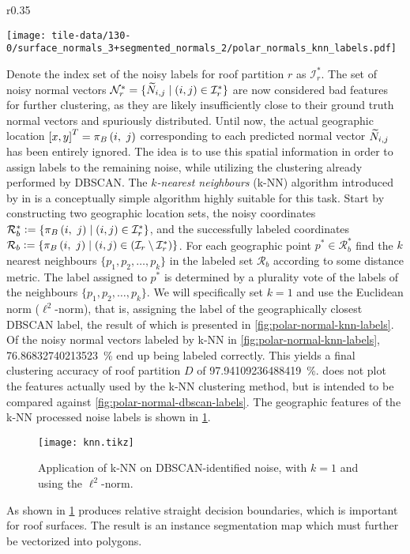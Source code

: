 \begin{wrapfigure}[16]{r}{0.35\textwidth}
  \begin{center}
    \texttt{[image: tile-data/130-0/surface\_normals\_3+segmented\_normals\_2/polar\_normals\_knn\_labels.pdf]}
  \end{center}
  \label{fig:polar-normal-knn-labels}
\end{wrapfigure}
Denote the index set of the noisy labels for roof partition $r$ as $\mathcal{I}_r^*$.
The set of noisy normal vectors $\mathcal{N}_r^* = \{\widetilde{N}_{i,j} \mid (i, j) \in \mathcal{I}_r^*\}$ are now considered bad features for further clustering, as they are likely insufficiently close to their ground truth normal vectors and spuriously distributed.
Until now, the actual geographic location ${[x, y]}^T = \pi_{B}\left(i,~j\right)$ corresponding to each predicted normal vector $\widetilde{N}_{i,j}$ has been entirely ignored.
The idea is to use this spatial information in order to assign labels to the remaining noise, while utilizing the clustering already performed by DBSCAN.
The \textit{$k$-nearest neighbours} (k-NN) algorithm introduced by \citeauthor{knn} in \citeyear{knn} \cite{knn} is a conceptually simple algorithm highly suitable for this task.
Start by constructing two geographic location sets, the noisy coordinates $\mathcal{R}_b^* \vcentcolon= \{\pi_{B}\left(i,~j\right) \mid (i, j) \in \mathcal{I}_r^* \}$, and the successfully labeled coordinates $\mathcal{R}_b \vcentcolon= \{\pi_{B}\left(i,~j\right) \mid (i, j) \in (\mathcal{I}_r \setminus \mathcal{I}_r^*)\}$.
For each geographic point $p^* \in \mathcal{R}_b^*$ find the $k$ nearest neighbours $\{p_1, p_2, \ldots, p_k\}$ in the labeled set $\mathcal{R}_b$ according to some distance metric.
The label assigned to $p^*$ is determined by a plurality vote of the labels of the neighbours $\{p_1, p_2, \ldots, p_k\}$.
We will specifically set $k = 1$ and use the Euclidean norm ($\ell^2$-norm), that is, assigning the label of the geographically closest DBSCAN label, the result of which is presented in \cref{fig:polar-normal-knn-labels}.
Of the noisy normal vectors labeled by k-NN in \cref{fig:polar-normal-knn-labels}, \SI[round-mode=places,round-precision=1]{76.86832740213523}{\percent} end up being labeled correctly.
This yields a final clustering accuracy of roof partition $D$ of \SI[round-mode=places,round-precision=1]{97.94109236488419}{\percent}.
 does not plot the features actually used by the k-NN clustering method, but is intended to be compared against \cref{fig:polar-normal-dbscan-labels}.
The geographic features of the k-NN processed noise labels is shown in \cref{fig:knn-tile}.
\begin{figure}[H]
  \centering
  \texttt{[image: knn.tikz]}
  \caption{Application of k-NN on DBSCAN-identified noise, with $k = 1$ and using the $\ell^2$-norm.}
  \label{fig:knn-tile}
\end{figure}
\noindent
As shown in \cref{fig:knn-tile} produces relative straight decision boundaries, which is important for roof surfaces.
The result is an instance segmentation map which must further be vectorized into polygons.
\newpage

